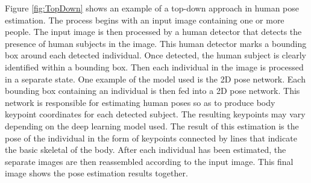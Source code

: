 Figure \ref{fig:TopDown} shows an example of a top-down approach in human pose estimation. The process begins with an input image containing one or more people. The input image is then processed by a human detector that detects the presence of human subjects in the image. This human detector marks a bounding box around each detected individual. Once detected, the human subject is clearly identified within a bounding box. Then each individual in the image is processed in a separate state. One example of the model used is the 2D pose network. Each bounding box containing an individual is then fed into a 2D pose network. This network is responsible for estimating human poses so as to produce body keypoint coordinates for each detected subject. The resulting keypoints may vary depending on the deep learning model used. The result of this estimation is the pose of the individual in the form of keypoints connected by lines that indicate the basic skeletal of the body. After each individual has been estimated, the separate images are then reassembled according to the input image. This final image shows the pose estimation results together.

